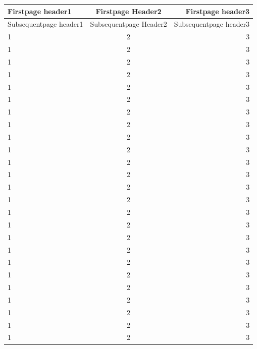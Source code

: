 \documentclass[a4paper,12pt]{article}
\begin{document}
\begin{longtable}{LCR}
        \toprule
        Firstpage header1 & Firstpage Header2 & Firstpage header3 \\
        \midrule
        \endfirsthead
         
        \toprule
        Subsequentpage header1 & Subsequentpage Header2 & Subsequentpage header3 \\
        \midrule
        \endhead

        1 & 2 & 3 \\
        1 & 2 & 3 \\
        1 & 2 & 3 \\
        1 & 2 & 3 \\
        1 & 2 & 3 \\
        1 & 2 & 3 \\
        1 & 2 & 3 \\
        1 & 2 & 3 \\
        1 & 2 & 3 \\
        1 & 2 & 3 \\
        1 & 2 & 3 \\
        1 & 2 & 3 \\
        1 & 2 & 3 \\
        1 & 2 & 3 \\
        1 & 2 & 3 \\
        1 & 2 & 3 \\
        1 & 2 & 3 \\
        1 & 2 & 3 \\
        1 & 2 & 3 \\
        1 & 2 & 3 \\
        1 & 2 & 3 \\
        1 & 2 & 3 \\
        1 & 2 & 3 \\
        1 & 2 & 3 \\
        1 & 2 & 3 \\

        \bottomrule


\end{longtable}
\end{document}

